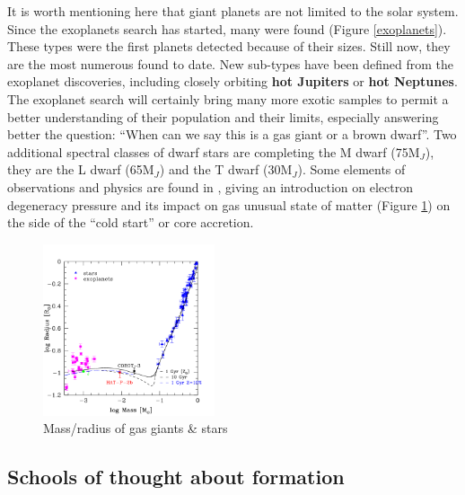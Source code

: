 \documentclass[12pt]{article} %
\begin{document}
It is worth mentioning here that giant planets are not limited to the solar system. Since the exoplanets search has started, many were found (Figure \ref{exoplanets}). These types were the first planets detected because of their sizes. Still now, they are the most numerous found to date. New sub-types have been defined from the exoplanet discoveries, including closely orbiting \textbf{hot Jupiters} or \textbf{hot Neptunes}. \newline\linebreak
\clearpage
\noindent The exoplanet search will certainly bring many more exotic samples to permit a better understanding of their population and their limits, especially answering better the question: ``When can we say this is a gas giant or a brown dwarf''. Two additional spectral classes of dwarf stars are completing the M dwarf (75M$_J$), they are the L dwarf (65M$_J$) and the T dwarf (30M$_J$). Some elements of observations and physics are found in \cite{Jeffries:2015:Online}, giving an introduction on electron degeneracy pressure and its impact on gas unusual state of matter (Figure \ref{gas_giants_vs_stars}) on the side of the ``cold start'' or core accretion.

\begin{figure}
\begin{center}
 \includegraphics[width=0.45\textwidth,keepaspectratio=true]{./images/physics_stackexchange_com_questions_165283_gas_giant_six_times_more_massive}
 \caption{Mass/radius of gas giants \& stars \cite{Jeffries:2015:Online}}
 \label{gas_giants_vs_stars}
\end{center}
\end{figure}


\subsection{Schools of thought about formation}\vspace{-1ex}\bigskip
\end{document}
